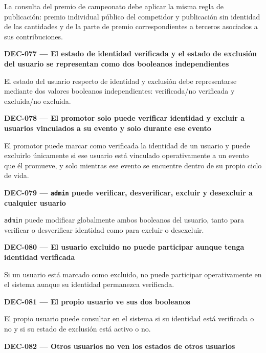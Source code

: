 \documentclass[10pt,letterpaper]{article}
\begin{document}
La consulta del premio de campeonato debe aplicar la misma regla de publicación: premio individual público del competidor y publicación sin identidad de las cantidades y de la parte de premio correspondientes a terceros asociados a sus contribuciones.\par\vspace{0.45em}
\noindent\textbf{DEC-077 --- El estado de identidad verificada y el estado de exclusión del usuario se representan como dos booleanos independientes}\par
El estado del usuario respecto de identidad y exclusión debe representarse mediante dos valores booleanos independientes: verificada/no verificada y excluida/no excluida.\par\vspace{0.45em}
\noindent\textbf{DEC-078 --- El promotor solo puede verificar identidad y excluir a usuarios vinculados a su evento y solo durante ese evento}\par
El promotor puede marcar como verificada la identidad de un usuario y puede excluirlo únicamente si ese usuario está vinculado operativamente a un evento que él promueve, y solo mientras ese evento se encuentre dentro de su propio ciclo de vida.\par\vspace{0.45em}
\noindent\textbf{DEC-079 --- \texttt{admin} puede verificar, desverificar, excluir y desexcluir a cualquier usuario}\par
\texttt{admin} puede modificar globalmente ambos booleanos del usuario, tanto para verificar o desverificar identidad como para excluir o desexcluir.\par\vspace{0.45em}
\noindent\textbf{DEC-080 --- El usuario excluido no puede participar aunque tenga identidad verificada}\par
Si un usuario está marcado como excluido, no puede participar operativamente en el sistema aunque su identidad permanezca verificada.\par\vspace{0.45em}
\noindent\textbf{DEC-081 --- El propio usuario ve sus dos booleanos}\par
El propio usuario puede consultar en el sistema si su identidad está verificada o no y si su estado de exclusión está activo o no.\par\vspace{0.45em}
\noindent\textbf{DEC-082 --- Otros usuarios no ven los estados de otros usuarios}\par
\end{document}
